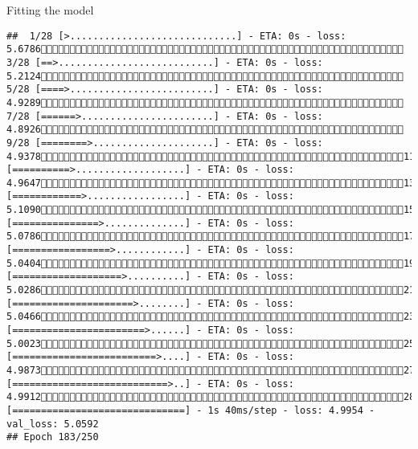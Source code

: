 \documentclass[
  ignorenonframetext,
]{beamer}
\begin{document}
\begin{frame}[fragile]{Fitting the model}
\begin{verbatim}
##  1/28 [>.............................] - ETA: 0s - loss: 5.6786 3/28 [==>...........................] - ETA: 0s - loss: 5.2124 5/28 [====>.........................] - ETA: 0s - loss: 4.9289 7/28 [======>.......................] - ETA: 0s - loss: 4.8926 9/28 [========>.....................] - ETA: 0s - loss: 4.937811/28 [==========>...................] - ETA: 0s - loss: 4.964713/28 [============>.................] - ETA: 0s - loss: 5.109015/28 [===============>..............] - ETA: 0s - loss: 5.078617/28 [=================>............] - ETA: 0s - loss: 5.040419/28 [===================>..........] - ETA: 0s - loss: 5.028621/28 [=====================>........] - ETA: 0s - loss: 5.046623/28 [=======================>......] - ETA: 0s - loss: 5.002325/28 [=========================>....] - ETA: 0s - loss: 4.987327/28 [===========================>..] - ETA: 0s - loss: 4.991228/28 [==============================] - 1s 40ms/step - loss: 4.9954 - val_loss: 5.0592
## Epoch 183/250

\end{verbatim}
\end{frame}
\end{document}
